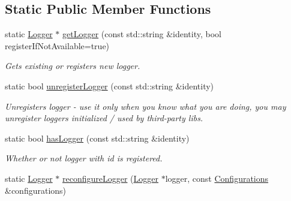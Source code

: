 \subsection*{Static Public Member Functions}
\begin{DoxyCompactItemize}
\item 
static \hyperlink{classel_1_1Logger}{Logger} $\ast$ \hyperlink{classel_1_1Loggers_aaebf868c558e3ba1d2e4f073a00f1d4a}{get\+Logger} (const std\+::string \&identity, bool register\+If\+Not\+Available=true)\hypertarget{classel_1_1Loggers_aaebf868c558e3ba1d2e4f073a00f1d4a}{}\label{classel_1_1Loggers_aaebf868c558e3ba1d2e4f073a00f1d4a}

\begin{DoxyCompactList}\small\item\em Gets existing or registers new logger. \end{DoxyCompactList}\item 
static bool \hyperlink{classel_1_1Loggers_a201d261ea57c070f07f0bf2006158587}{unregister\+Logger} (const std\+::string \&identity)\hypertarget{classel_1_1Loggers_a201d261ea57c070f07f0bf2006158587}{}\label{classel_1_1Loggers_a201d261ea57c070f07f0bf2006158587}

\begin{DoxyCompactList}\small\item\em Unregisters logger -\/ use it only when you know what you are doing, you may unregister loggers initialized / used by third-\/party libs. \end{DoxyCompactList}\item 
static bool \hyperlink{classel_1_1Loggers_a2d7a056cb7d9da3d96c709a2fac5c2bb}{has\+Logger} (const std\+::string \&identity)\hypertarget{classel_1_1Loggers_a2d7a056cb7d9da3d96c709a2fac5c2bb}{}\label{classel_1_1Loggers_a2d7a056cb7d9da3d96c709a2fac5c2bb}

\begin{DoxyCompactList}\small\item\em Whether or not logger with id is registered. \end{DoxyCompactList}\item 
static \hyperlink{classel_1_1Logger}{Logger} $\ast$ \hyperlink{classel_1_1Loggers_a888aca5bdccccc322da2eed430909d04}{reconfigure\+Logger} (\hyperlink{classel_1_1Logger}{Logger} $\ast$logger, const \hyperlink{classel_1_1Configurations}{Configurations} \&configurations)\hypertarget{classel_1_1Loggers_a888aca5bdccccc322da2eed430909d04}{}\label{classel_1_1Loggers_a888aca5bdccccc322da2eed430909d04}


\end{DoxyCompactItemize}
